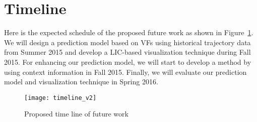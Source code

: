 
\section{Timeline}
Here is the expected schedule of the proposed future work as shown in Figure~\ref{fig:timeline}.
We will design a prediction model based on VFs using historical trajectory data from Summer 2015 and develop a LIC-based visualization technique during Fall 2015.
For enhancing our prediction model, we will start to develop a method by using context information in Fall 2015.
Finally, we will evaluate our prediction model and visualization technique in Spring 2016.

\begin{figure}[ht]
	\centering
	\texttt{[image: timeline\_v2]}
	\caption{Proposed time line of future work}
	\label{fig:timeline}
\end{figure}




























